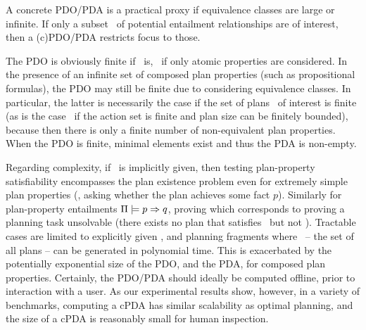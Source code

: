 A concrete PDO/PDA is a practical proxy if equivalence classes are
large or infinite. If only a subset \deps\ of potential entailment
relationships are of interest, then a (c)PDO/PDA restricts focus to
those.

The PDO is obviously finite if \props\ is, \eg\ if only atomic
properties are considered. In the presence of an infinite set of
composed plan properties (such as propositional formulas), the PDO may
still be finite due to considering equivalence classes. In particular,
the latter is necessarily the case if the set of plans \plans\ of
interest is finite (as is the case \eg\ if the action set is finite
and plan size can be finitely bounded), because then there is only a
finite number of non-equivalent plan properties.
%
When the PDO is finite, minimal elements exist and thus the PDA is
non-empty.

Regarding complexity, if \plans\ is implicitly given, then testing
plan-property satisfiability encompasses the plan existence problem
even for extremely simple plan properties (\eg, asking whether the
plan achieves some fact $p$). Similarly for plan-property entailments
$\Pi \models p \Rightarrow q$, proving which corresponds to
proving a planning task unsolvable (there exists no plan that
satisfies \prop\ but not \propq). Tractable cases are limited to
explicitly given \plans, and planning fragments where \plans\ -- the
set of all plans -- can be generated in polynomial time. This is
exacerbated by the potentially exponential size of the PDO, and the
PDA, for composed plan properties. Certainly, the PDO/PDA should
ideally be computed offline, prior to interaction with a user. As our
experimental results show, however, in a variety of benchmarks,
computing a cPDA has similar scalability as optimal planning, and the
size of a cPDA is reasonably small for human inspection.


%
%


